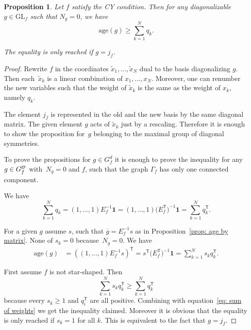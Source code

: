 \documentclass[10pt,a4paper]{amsart}
\numberwithin{equation}{section}
\newtheorem{Proposition}[Theorem]{Proposition}
 { \theoremstyle{definition}
\newtheorem{Definition}[Theorem]{Definition}
\newtheorem{Note}[Theorem]{Note}
\newtheorem{Example}[Theorem]{Example}
\newtheorem{Remark}[Theorem]{Remark} }
\newcommand{\GL}{{\mathrm{GL}}}
\newcommand{\age}{\mathrm{age}}
\begin{document}
\begin{Proposition}\label{prop: age greater than weights}
 Let $f$ satisfy the CY condition.
	Then for any diagonalizable $g \in \GL_f$ such that $N_g = 0$, we have
	\begin{equation*}
		\age(g) \ge \sum_{k=1}^N q_k.
	\end{equation*}

	The equality is only reached if $g = j_f$.
\end{Proposition}
\begin{proof}
Rewrite $f$ in the coordinates $\widetilde x_1,\dots,\widetilde x_N$ dual to the basis diagonalizing $g$. Then each~$\widetilde x_k$ is a linear combination of $x_1,\dots,x_N$. Moreover, one can renumber the new variables such that the weight of $\widetilde x_k$ is the same as the weight of $x_k$, namely $q_k$.

The element $j_f$ is represented in the old and the new basis by the same diagonal matrix. The given element $g$ acts of $\widetilde x_k$ just by a rescaling. Therefore it is enough to show the proposition for~$g$ belonging to the maximal group of diagonal symmetries.

To prove the propositions for $g \in G_f^d$ it is enough to prove the inequality for any $g \in G_f^{\rm gr}$ with~$N_g=0$ and $f$, such that the graph $\Gamma_f$ has only one connected component.

We have
\begin{equation}\label{eq: sum of weights}
	 \sum_{k=1}^N q_k = (1,\dots,1) E_f^{-1} \boldsymbol{1} = (1,\dots,1) \bigl(E_f^{\mathsf{T}}\bigr)^{-1} \boldsymbol{1} = \sum_{k=1}^N q_k^{\mathsf{T}}.
\end{equation}

For a given $g$ assume $s$, such that $\overline g = E_f^{-1}s$ as in Proposition~\ref{prop: age by matrix}. None of $s_k =0$ because~$N_g=0$. We have
\begin{align*}
	\age(g) &= ( (1,\dots,1) E_f^{-1} s )^{\mathsf{T}} = s^{\mathsf{T}} \bigl(E_f^{\mathsf{T}}\bigr)^{-1} \boldsymbol{1} = \sum_{k=1}^N s_k q_k^{\mathsf{T}}.
\end{align*}

First assume $f$ is not star-shaped. Then
\[
 \sum_{k=1}^N s_k q_k^{\mathsf{T}} \ge \sum_{k=1}^N q_k^{\mathsf{T}}
\]
because every $s_k \ge 1$ and $q_i^{\mathsf{T}}$ are all positive. Combining with equation~\eqref{eq: sum of weights} we get the inequality claimed. Moreover it is obvious that the equality is only reached if $s_k=1$ for all $k$. This is equivalent to the fact that $g = j_f$.


\end{proof}
\end{document}

